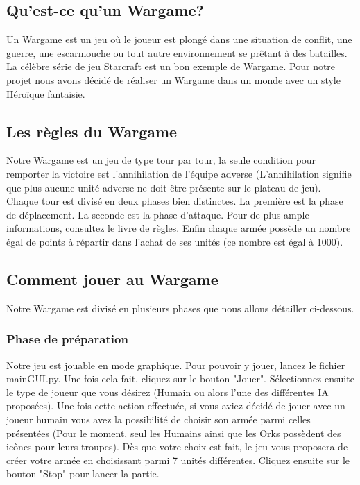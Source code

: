 \documentclass{article}
\begin{document}
 \subsection{Qu'est-ce qu'un Wargame?}
 Un Wargame est un jeu où le joueur est plongé dans une situation de conflit, une guerre, une escarmouche ou tout autre environnement se prêtant à des batailles. La célèbre série de jeu Starcraft est un bon exemple de Wargame. Pour notre projet nous avons décidé de réaliser un Wargame dans un monde avec un style Héroïque fantaisie.
 \subsection{Les règles du Wargame}
 Notre Wargame est un jeu de type tour par tour, la seule condition pour remporter la victoire est l'annihilation de l'équipe adverse (L'annihilation signifie que plus aucune unité adverse ne doit être présente sur le plateau de jeu). Chaque tour est divisé en deux phases bien distinctes. La première est la phase de déplacement. La seconde est la phase d'attaque. Pour de plus ample informations, consultez le livre de règles. Enfin chaque armée possède un nombre égal de points à répartir dans l'achat de ses unités (ce nombre est égal à 1000).
 
 \subsection{Comment jouer au Wargame}
 Notre Wargame est divisé en plusieurs phases que nous allons détailler ci-dessous.
 
 \subsubsection{Phase de préparation}
  Notre jeu est jouable en mode graphique. Pour pouvoir y jouer, lancez le fichier mainGUI.py. Une fois cela fait, cliquez sur le bouton "Jouer". Sélectionnez ensuite le type de joueur que vous désirez (Humain ou alors l'une des différentes IA proposées). Une fois cette action effectuée, si vous aviez décidé de jouer avec un joueur humain vous avez la possibilité de choisir son armée parmi celles présentées (Pour le moment, seul les Humains ainsi que les Orks possèdent des icônes pour leurs troupes). Dès que votre choix est fait, le jeu vous proposera de créer votre armée en choisissant parmi 7 unités différentes. Cliquez ensuite sur le bouton "Stop" pour lancer la partie.
  
\end{document}
